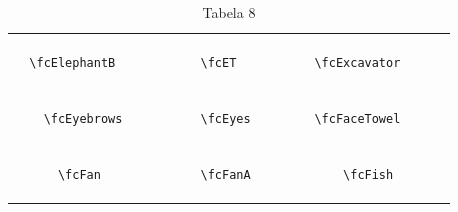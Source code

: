 \documentclass[x11names]{article}
\begin{document}
\begin{table}[H]
\begin{tabular}{|c|c|c|c|c|c|}
		&\multirow{5}{*}{	\fcElephantB	[scale=0.16]} & &\multirow{5}{*}{	\fcET	[scale=0.16]} & &\multirow{5}{*}{	\fcExcavator	[scale=0.09]}\\	& & & & & \\	& & & & & \\	\verb|	\fcElephantB	| & & \verb|	\fcET	| & & \verb|	\fcExcavator	| & \\	& & & & & \\	& & & & & \\	& & & & & \\	\hline									
		&\multirow{5}{*}{	\fcEyebrows	[scale=0.16]} & &\multirow{5}{*}{	\fcEyes	[scale=0.16]} & &\multirow{5}{*}{	\fcFaceTowel	[scale=0.09]}\\	& & & & & \\	& & & & & \\	\verb|	\fcEyebrows	| & & \verb|	\fcEyes	| & & \verb|	\fcFaceTowel	| & \\	& & & & & \\	& & & & & \\	& & & & & \\	\hline									
		&\multirow{5}{*}{	\fcFan	[scale=0.64]} & &\multirow{5}{*}{	\fcFanA	[scale=0.09]} & &\multirow{5}{*}{	\fcFish	[scale=0.64]}\\	& & & & & \\	& & & & & \\	\verb|	\fcFan	| & & \verb|	\fcFanA	| & & \verb|	\fcFish	| & \\	& & & & & \\	& & & & & \\	& & & & & \\		\hline 	\hline 	\end{tabular}	\caption{	Tabela 8	}\label{	Tab8	}\end{table}
\end{document}
